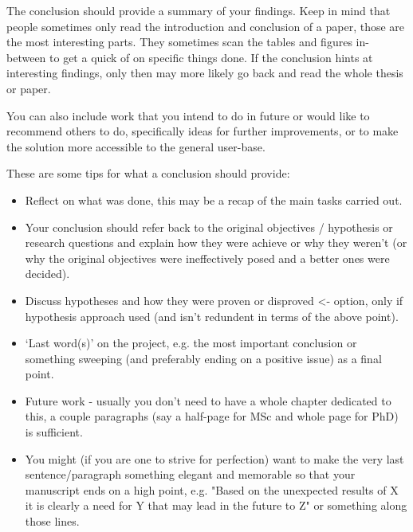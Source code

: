 \label{Ch:Conclusion}

The conclusion should provide a summary of your findings.  Keep in mind that people sometimes only read the introduction and conclusion of a paper, those are the most interesting parts.  They sometimes scan the tables and figures in-between to get a quick of on specific things done.  If the conclusion hints at interesting findings, only then may more likely go back and read the whole thesis or paper.

You can also include work that you intend to do in future or would like to recommend others to do, specifically ideas for further improvements, or to make the solution more accessible to the general user-base.

These are some tips for what a conclusion should provide:

\begin{itemize}
	\item Reflect on what was done, this may be a recap of the main tasks carried out.
	\item Your conclusion should refer back to the original objectives / hypothesis or research questions and explain how they were achieve or why they weren't (or why the original objectives were ineffectively posed and a better ones were decided).
	\item Discuss hypotheses and how they were proven or disproved <- option, only if hypothesis approach used (and isn't redundent in terms of the above point).
	\item `Last word(s)' on the project, e.g. the most important conclusion or something sweeping (and preferably ending on a positive issue) as a final point.
	\item Future work - usually you don't need to have a whole chapter dedicated to this, a couple paragraphs (say a half-page for MSc and whole page for PhD) is sufficient.
	\item You might (if you are one to strive for perfection) want to make the very last sentence/paragraph something elegant and memorable so that your manuscript ends on a high point, e.g. "Based on the unexpected results of X it is clearly a need for Y that may lead in the future to Z" or something along those lines.
\end{itemize}

